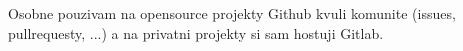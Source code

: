 \documentclass[12pt,a5paper]{article}
\begin{document}
Osobne pouzivam na opensource projekty Github kvuli komunite (issues, pullrequesty, ...) a na privatni projekty si sam hostuji Gitlab.

\end{document}
